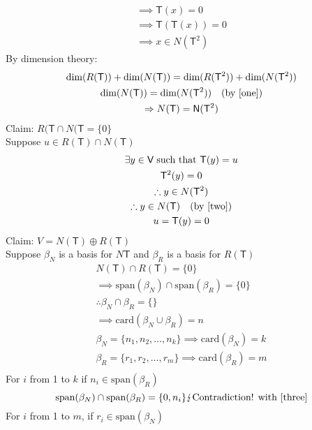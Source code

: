 \begin{enumerate}[(a)]
\begin{gather}
\implies \mathsf{T}(x) = 0 \\
\implies \mathsf{T}(\mathsf{T}(x)) = 0\\
\implies x \in N(\mathsf{T}^2)
\end{gather}
By dimension theory:
\begin{gather}
\text{dim}(R(\mathsf{T})) + \text{dim}(N(\mathsf{T})) =
\text{dim}(R(\mathsf{T}^2)) + \text{dim}(N(\mathsf{T}^2))\\
\text{dim}(N(\mathsf{T})) = \text{dim}(N(\mathsf{T}^2)) \quad
(\text{by \ref{one}})\\
\implies N(\mathsf{T}) = \mathsf{N}(\mathsf{T}^2) \label{two}
\end{gather}
Claim: $R(\mathsf{T}\cap N(\mathsf{T} = \{0\}$
\\Suppose $u \in R(\mathsf{T}) \cap N(\mathsf{T})$
\begin{gather}
\exists y \in \mathsf{V}\; \text{such that } \mathsf{T}(y) = u\\
\mathsf{T}^2(y) = 0 \\
\therefore y \in N(\mathsf{T}^2)\\
\therefore y \in N(\mathsf{T}) \quad (\text{by \ref{two}})\\
u = \mathsf{T}(y) = 0
\end{gather}
Claim: $V = N(\mathsf{T}) \oplus R(\mathsf{T})$
\\Suppose $\beta_N$ is a basis for $N\mathsf{T}$ and $\beta_R$ is a
basis for $R(\mathsf{T})$
\begin{gather}
N(\mathsf{T}) \cap R(\mathsf{T}) =\{0\}\\
\implies \text{span}(\beta_N)\cap \text{span}(\beta_R)
=\{0\} \label{three}\\
\therefore \beta_N\cap \beta_R = \{\}\\
\implies \text{card}(\beta_N\cup\beta_R) = n\\
\beta_N =\{n_1,n_2,\dotsc,n_k\} \implies \text{card}(\beta_N) = k\\
\beta_R =\{r_1,r_2,\dotsc,r_m\} \implies \text{card}(\beta_R) =m\\
\end{gather}
For $i$ from 1 to $k$ if $n_i \in \text{span}(\beta_R)$
\begin{equation}
\text{span}(\beta_N)\cap\text{span}(\beta_R) = \{0,n_i\} \lightning
\text{Contradiction! with \ref{three}} 
\end{equation}
For $i$ from 1 to $m$, if $r_i \in \text{span}(\beta_N)$
\begin{equation}

\end{equation}
\end{enumerate}
